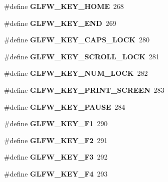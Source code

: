 \begin{DoxyCompactItemize}
\#define {\bfseries G\+L\+F\+W\+\_\+\+K\+E\+Y\+\_\+\+H\+O\+ME}~268
\item 
\mbox{\label{group__keys_ga86587ea1df19a65978d3e3b8439bedd9}} 
\#define {\bfseries G\+L\+F\+W\+\_\+\+K\+E\+Y\+\_\+\+E\+ND}~269
\item 
\mbox{\label{group__keys_ga92c1d2c9d63485f3d70f94f688d48672}} 
\#define {\bfseries G\+L\+F\+W\+\_\+\+K\+E\+Y\+\_\+\+C\+A\+P\+S\+\_\+\+L\+O\+CK}~280
\item 
\mbox{\label{group__keys_gaf622b63b9537f7084c2ab649b8365630}} 
\#define {\bfseries G\+L\+F\+W\+\_\+\+K\+E\+Y\+\_\+\+S\+C\+R\+O\+L\+L\+\_\+\+L\+O\+CK}~281
\item 
\mbox{\label{group__keys_ga3946edc362aeff213b2be6304296cf43}} 
\#define {\bfseries G\+L\+F\+W\+\_\+\+K\+E\+Y\+\_\+\+N\+U\+M\+\_\+\+L\+O\+CK}~282
\item 
\mbox{\label{group__keys_gaf964c2e65e97d0cf785a5636ee8df642}} 
\#define {\bfseries G\+L\+F\+W\+\_\+\+K\+E\+Y\+\_\+\+P\+R\+I\+N\+T\+\_\+\+S\+C\+R\+E\+EN}~283
\item 
\mbox{\label{group__keys_ga8116b9692d87382afb5849b6d8907f18}} 
\#define {\bfseries G\+L\+F\+W\+\_\+\+K\+E\+Y\+\_\+\+P\+A\+U\+SE}~284
\item 
\mbox{\label{group__keys_gafb8d66c573acf22e364049477dcbea30}} 
\#define {\bfseries G\+L\+F\+W\+\_\+\+K\+E\+Y\+\_\+\+F1}~290
\item 
\mbox{\label{group__keys_ga0900750aff94889b940f5e428c07daee}} 
\#define {\bfseries G\+L\+F\+W\+\_\+\+K\+E\+Y\+\_\+\+F2}~291
\item 
\mbox{\label{group__keys_gaed7cd729c0147a551bb8b7bb36c17015}} 
\#define {\bfseries G\+L\+F\+W\+\_\+\+K\+E\+Y\+\_\+\+F3}~292
\item 
\mbox{\label{group__keys_ga9b61ebd0c63b44b7332fda2c9763eaa6}} 
\#define {\bfseries G\+L\+F\+W\+\_\+\+K\+E\+Y\+\_\+\+F4}~293
\item 
\mbox{\label{group__keys_gaf258dda9947daa428377938ed577c8c2}} 

\end{DoxyCompactItemize}
